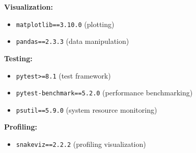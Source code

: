 \documentclass[a4paper,14pt]{extarticle}
\begin{document}
\textbf{Visualization:}
\begin{itemize}
  \item \texttt{matplotlib==3.10.0} (plotting)
  \item \texttt{pandas==2.3.3} (data manipulation)
\end{itemize}

\textbf{Testing:}
\begin{itemize}
  \item \texttt{pytest>=8.1} (test framework)
  \item \texttt{pytest-benchmark==5.2.0} (performance benchmarking)
  \item \texttt{psutil==5.9.0} (system resource monitoring)
\end{itemize}

\textbf{Profiling:}
\begin{itemize}
  \item \texttt{snakeviz==2.2.2} (profiling visualization)
\end{itemize}


\ifdefined\reportcomposed\else
\newpage
\printbibliography
\fi
\end{document}
